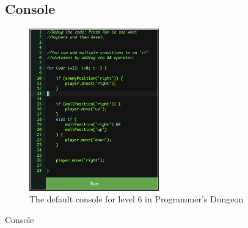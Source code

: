 \documentclass[a4paper,11.5pt]{report}
\numberwithin{figure}{section}
\numberwithin{table}{section}
\numberwithin{equation}{section}
\numberwithin{equation}{section}
\begin{document}
\subsection{Console}

\begin{figure}
    \includegraphics[width=0.5\textwidth]{consolelevelsix}
       \captionsetup{justification=centering}
\caption{The default console for level 6 in Programmer's Dungeon}
\label{fig:consolelevelsix}
\end{figure}

Console









\end{document}
